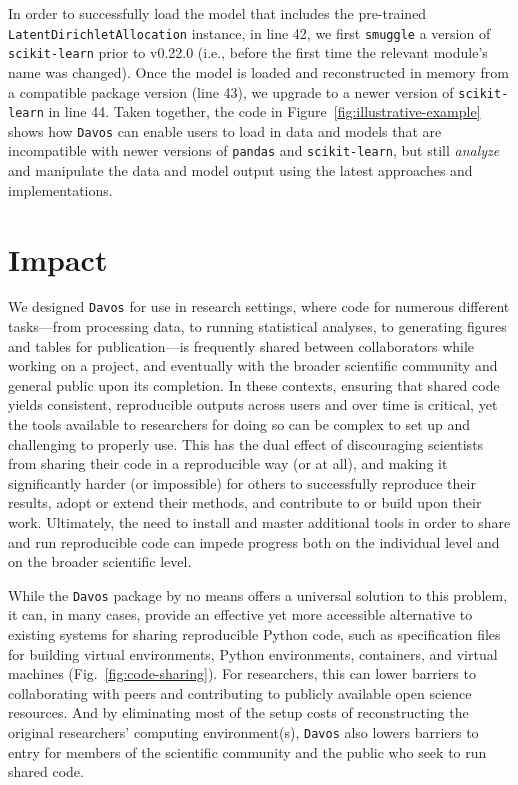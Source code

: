 \documentclass[preprint,12pt,a4paper]{elsarticle}
\begin{document}
In order to successfully load the model that includes the pre-trained
\texttt{Latent\-Dir\-ich\-let\-Allocation} instance, in line 42, we first
\texttt{smuggle} a version of \texttt{scikit-learn} prior to v0.22.0 (i.e.,
before the first time the relevant module's name was changed). Once
the model is loaded and reconstructed in memory from a compatible
package version (line 43), we upgrade to a newer version of
\texttt{scikit-learn} in line 44. Taken together, the code in
Figure~\ref{fig:illustrative-example} shows how \texttt{Davos} can
enable users to load in data and models that are incompatible with
newer versions of \texttt{pandas} and \texttt{scikit-learn}, but still
\textit{analyze} and manipulate the data and model output using the
latest approaches and implementations.


\section{Impact}\label{sec:impact}

We designed \texttt{Davos} for use in research settings, where code for numerous different tasks---from processing data, to running statistical analyses, to generating figures and tables for publication---is frequently shared between collaborators while working on a project, and eventually with the broader scientific community and general public upon its completion.
In these contexts, ensuring that shared code yields consistent, reproducible outputs across users and over time is critical, yet the tools available to researchers for doing so can be complex to set up and challenging to properly use.
This has the dual effect of discouraging scientists from sharing their code in a reproducible way (or at all), and making it significantly harder (or impossible) for others to successfully reproduce their results, adopt or extend their methods, and contribute to or build upon their work.
Ultimately, the need to install and master additional tools in order to share and run reproducible code can impede progress both on the individual level and on the broader scientific level.

While the \texttt{Davos} package by no means offers a universal solution to this problem, it can, in many cases, provide an effective yet more accessible alternative to existing systems for sharing reproducible Python code, such as specification files for building virtual environments, Python environments, containers, and virtual machines (Fig.~\ref{fig:code-sharing}).
For researchers, this can lower barriers to collaborating with peers and contributing to publicly available open science resources.
And by eliminating most of the setup costs of reconstructing the original researchers' computing environment(s), \texttt{Davos} also lowers barriers to entry for members of the scientific community and the public who seek to run shared code.
\end{document}
